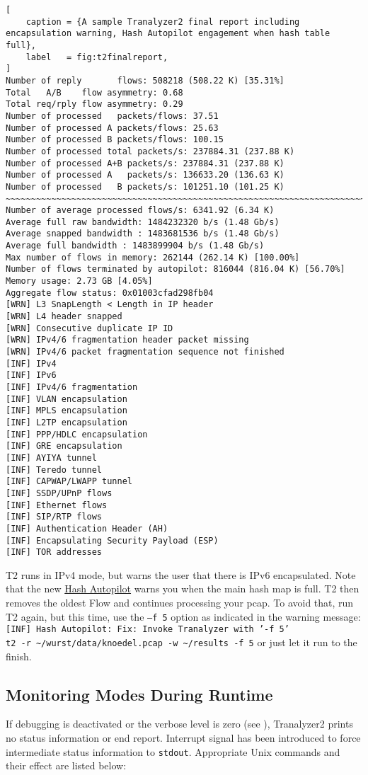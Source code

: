 \begin{lstlisting}[
    caption = {A sample Tranalyzer2 final report including encapsulation warning, Hash Autopilot engagement when hash table full},
    label   = fig:t2finalreport,
]
Number of reply       flows: 508218 (508.22 K) [35.31%]
Total   A/B    flow asymmetry: 0.68
Total req/rply flow asymmetry: 0.29
Number of processed   packets/flows: 37.51
Number of processed A packets/flows: 25.63
Number of processed B packets/flows: 100.15
Number of processed total packets/s: 237884.31 (237.88 K)
Number of processed A+B packets/s: 237884.31 (237.88 K)
Number of processed A   packets/s: 136633.20 (136.63 K)
Number of processed   B packets/s: 101251.10 (101.25 K)
~~~~~~~~~~~~~~~~~~~~~~~~~~~~~~~~~~~~~~~~~~~~~~~~~~~~~~~~~~~~~~~~~~~~~~~~~~~~~~~~
Number of average processed flows/s: 6341.92 (6.34 K)
Average full raw bandwidth: 1484232320 b/s (1.48 Gb/s)
Average snapped bandwidth : 1483681536 b/s (1.48 Gb/s)
Average full bandwidth : 1483899904 b/s (1.48 Gb/s)
Max number of flows in memory: 262144 (262.14 K) [100.00%]
Number of flows terminated by autopilot: 816044 (816.04 K) [56.70%]
Memory usage: 2.73 GB [4.05%]
Aggregate flow status: 0x01003cfad298fb04
[WRN] L3 SnapLength < Length in IP header
[WRN] L4 header snapped
[WRN] Consecutive duplicate IP ID
[WRN] IPv4/6 fragmentation header packet missing
[WRN] IPv4/6 packet fragmentation sequence not finished
[INF] IPv4
[INF] IPv6
[INF] IPv4/6 fragmentation
[INF] VLAN encapsulation
[INF] MPLS encapsulation
[INF] L2TP encapsulation
[INF] PPP/HDLC encapsulation
[INF] GRE encapsulation
[INF] AYIYA tunnel
[INF] Teredo tunnel
[INF] CAPWAP/LWAPP tunnel
[INF] SSDP/UPnP flows
[INF] Ethernet flows
[INF] SIP/RTP flows
[INF] Authentication Header (AH)
[INF] Encapsulating Security Payload (ESP)
[INF] TOR addresses
\end{lstlisting}

T2 runs in IPv4 mode, but warns the user that there is IPv6 encapsulated.
Note that the new \hyperref[hash_autopilot]{Hash Autopilot} warns you when the main hash map is full.
T2 then removes the oldest Flow and continues processing your pcap.
To avoid that, run T2 again, but this time, use the {\tt --f 5} option as indicated in the warning message:
{\tt [INF] Hash Autopilot: Fix: Invoke Tranalyzer with '-f 5'} \\
{\tt t2 -r \textasciitilde/wurst/data/knoedel.pcap -w \textasciitilde/results -f 5}
or just let it run to the finish.

\subsection{Monitoring Modes During Runtime}
If debugging is deactivated or the verbose level is zero (see ), Tranalyzer2 prints no status information or end report.
Interrupt signal has been introduced to force intermediate status information to {\tt stdout}. Appropriate Unix commands and their effect are listed below:


